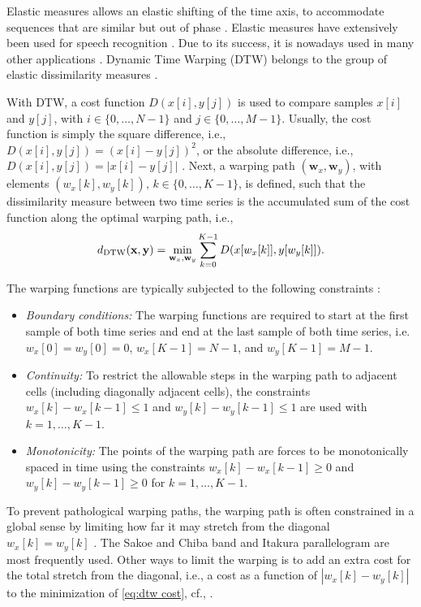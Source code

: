 \documentclass[10pt,final,a4paper,oneside,onecolumn]{article}
\newcommand{\ddtw}{d_{\textup{DTW}}}
\theoremstyle{plain}\newtheorem{definition}{Definition}[section]    %
\theoremstyle{definition}\newtheorem{example}{Example}[section]     %
\theoremstyle{remark}\newtheorem{remarkenv}{Remark}[section]        %
\begin{document}
Elastic measures allows an elastic shifting of the time axis, to accommodate sequences that are similar but out of phase \cite{keogh2005exactDTW}. Elastic measures have extensively been used for speech recognition \cite{rabiner1993speech, muller2007information}. Due to its success, it is nowadays used in many other applications \cite{serra2014empirical, wang2013distancemeasures}. Dynamic Time Warping (DTW) \cite{sakoe1978dynamic, berndt1994using} belongs to the group of elastic dissimilarity measures \cite{wang2013distancemeasures}.

With DTW, a cost function $D(x[i], y[j])$ is used to compare samples $x[i]$ and $y[j]$, with $i \in \{0, \ldots, N-1\}$ and $j \in \{0, \ldots, M-1\}$. Usually, the cost function is simply the square difference, i.e., $D(x[i], y[j]) = (x[i]-y[j])^2$, or the absolute difference, i.e., $D(x[i], y[j])=|x[i] - y[j]|$ \cite{berndt1994using}. Next, a warping path $(\textbf{w}_x, \textbf{w}_y)$, with elements $(w_x[k], w_y[k]),\,k \in \{0, \ldots, K-1\}$, is defined, such that the dissimilarity measure between two time series is the accumulated sum of the cost function along the optimal warping path, i.e.,
\begin{equation} \label{eq:dtw cost}
	\ddtw(\textbf{x}, \textbf{y}) = \min_{\textbf{w}_x, \textbf{w}_y} \sum_{k=0}^{K-1} D(x[w_x[k]], y[w_y[k]]).
\end{equation}

The warping functions are typically subjected to the following constraints \cite{keogh2005exactDTW}:
\begin{itemize}
	\item \emph{Boundary conditions:} The warping functions are required to start at the first sample of both time series and end at the last sample of both time series, i.e. $w_x[0]=w_y[0]=0$, $w_x[K-1]=N-1$, and $w_y[K-1]=M-1$. 
	\item \emph{Continuity:} To restrict the allowable steps in the warping path to adjacent cells (including diagonally adjacent cells), the constraints $w_x[k] - w_x[k-1] \leq 1$ and $w_y[k] - w_y[k-1] \leq 1$ are used with $k=1, \ldots, K-1$.
	\item \emph{Monotonicity:} The points of the warping path are forces to be monotonically spaced in time using the constraints $w_x[k] - w_x[k-1] \geq 0$ and $w_y[k] - w_y[k-1] \geq 0$ for $k=1, \ldots, K-1$. 
\end{itemize}

To prevent pathological warping paths, the warping path is often constrained in a global sense by limiting how far it may stretch from the diagonal $w_x[k]=w_y[k]$ \cite{keogh2005exactDTW}. The Sakoe and Chiba band \cite{sakoe1978dynamic} and Itakura parallelogram \cite{itakura1975minimum} are most frequently used. Other ways to limit the warping is to add an extra cost for the total stretch from the diagonal, i.e., a cost as a function of $|w_x[k] - w_y[k]|$ to the minimization of \cref{eq:dtw cost}, cf., \cite{roberts1987enhancements, wang1997alignment}.
\end{document}
